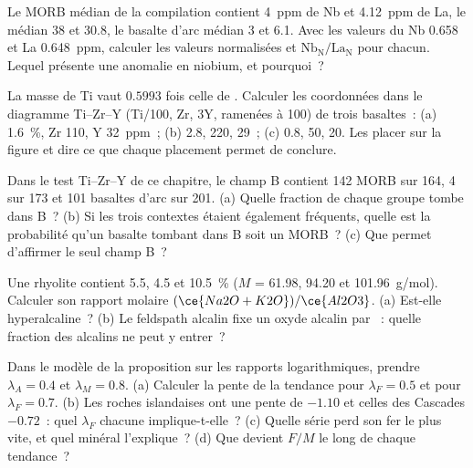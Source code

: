 \begin{exercise}[$\star\star$]\label{exo:b2:magmatic-series:6}
Le MORB médian de la compilation contient \qty{4}{ppm} de Nb et \qty{4.12}{ppm} de La, le
 médian 38 et 30.8, le basalte d'arc médian 3 et 6.1. Avec les valeurs du
 Nb 0.658 et La \qty{0.648}{ppm}, calculer les valeurs normalisées
et $\mathrm{Nb_N}/\mathrm{La_N}$ pour chacun. Lequel présente une anomalie en niobium, et pourquoi~?
\end{exercise}

\begin{exercise}[$\star\star$]\label{exo:b2:magmatic-series:7}
La masse de Ti vaut $0.5993$ fois celle de . Calculer les coordonnées dans le diagramme Ti--Zr--Y
(Ti/100, Zr, $3\mathrm Y$, ramenées à 100) de trois basaltes~: (a) 
\qty{1.6}{\percent}, Zr 110, Y \qty{32}{ppm}~; (b) 2.8, 220, 29~; (c) 0.8, 50, 20. Les placer
sur la figure et dire ce que chaque placement permet de conclure.
\end{exercise}

\begin{exercise}[$\star\star$]\label{exo:b2:magmatic-series:8}
Dans le test Ti--Zr--Y de ce chapitre, le champ B contient 142 MORB sur 164, 4  sur 173 et 101 basaltes d'arc sur 201. (a) Quelle fraction de chaque groupe tombe
dans B~? (b) Si les trois contextes étaient également fréquents, quelle est la probabilité qu'un basalte
tombant dans B soit un MORB~? (c) Que permet d'affirmer le seul champ B~?
\end{exercise}

\begin{exercise}[$\star\star$]\label{exo:b2:magmatic-series:9}
Une rhyolite contient  5.5,  4.5 et  \qty{10.5}{\percent} ($M$ =
61.98, 94.20 et \qty{101.96}{g/mol}). Calculer son rapport molaire $(\ce{Na2O +
K2O})/\ce{Al2O3}$. (a) Est-elle hyperalcaline~? (b) Le feldspath alcalin fixe un oxyde
alcalin par ~: quelle fraction des alcalins ne peut y entrer~?
\end{exercise}

\begin{exercise}[$\star\star\star$]\label{exo:b2:magmatic-series:10}
Dans le modèle de la proposition sur les rapports logarithmiques, prendre $\lambda_A = 0.4$ et $\lambda_M =
0.8$. (a) Calculer la pente de la tendance pour $\lambda_F = 0.5$ et pour $\lambda_F =
0.7$. (b) Les roches islandaises ont une pente de $-1.10$ et celles des Cascades
$-0.72$~: quel $\lambda_F$ chacune implique-t-elle~? (c) Quelle série perd son fer le plus vite,
et quel minéral l'explique~? (d) Que devient $F/M$ le long de chaque tendance~?
\end{exercise}

